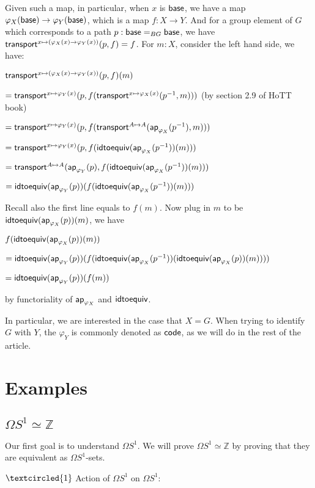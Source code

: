 \documentclass[11pt]{article}
\DeclareMathOperator{\base}{\sf base}
\DeclareMathOperator{\ap}{\sf ap}
\DeclareMathOperator{\code}{\sf code}
\DeclareMathOperator{\transport}{\sf transport}
\DeclareMathOperator{\idtoequiv}{\sf idtoequiv}
\theoremstyle{definition}
\begin{document}
   Given such a map, in particular, when $x$ is $\base$, we have a map $\varphi_X(\base)\to \varphi_Y(\base)$, which is a map $f:X\to Y$.
   And for a group element of $G$ which corresponds to a path $p:\base=_{BG}\base$, we have $\transport^{x\mapsto (\varphi_X(x)\to \varphi_Y(x))}(p, f)=f$. For $m:X$, consider the left hand side, we have:

   $\transport^{x\mapsto (\varphi_X(x)\to \varphi_Y(x))}(p, f)(m)$
   
   $=\transport^{x\mapsto \varphi_Y(x)}(p,f(\transport^{x\mapsto \varphi_X(x)}(p^{-1},m)))$ (by section 2.9 of HoTT book)

   $=\transport^{x\mapsto \varphi_Y(x)}(p,f(\transport^{A\mapsto A}(\ap_{\varphi_X}(p^{-1}),m)))$
   
   $=\transport^{x\mapsto \varphi_Y(x)}(p,f(\idtoequiv(\ap_{\varphi_X}(p^{-1}))(m)))$

   $=\transport^{A\mapsto A}(\ap_{\varphi_Y}(p),f(\idtoequiv(\ap_{\varphi_X}(p^{-1}))(m)))$

   $=\idtoequiv(\ap_{\varphi_Y}(p))(f(\idtoequiv(\ap_{\varphi_X}(p^{-1}))(m)))$
   
   Recall also the first line equals to $f(m)$. Now plug in $m$ to be $\idtoequiv(\ap_{\varphi_X}(p))(m)$, we have 

   $f(\idtoequiv(\ap_{\varphi_X}(p))(m))$

   $=\idtoequiv(\ap_{\varphi_Y}(p))(f(\idtoequiv(\ap_{\varphi_X}(p^{-1}))(\idtoequiv(\ap_{\varphi_X}(p))(m))))$

   $=\idtoequiv(\ap_{\varphi_Y}(p))(f(m))$

   by functoriality of $\ap_{\varphi_X}$ and $\idtoequiv$.

  In particular, we are interested in the case that $X=G$. When trying to identify $G$ with $Y$, the $\varphi_Y$ is commonly denoted as $\code$, as we will do in the rest of the article.
\section{Examples}

\subsection{$\Omega S^1\simeq \mathbb Z$}
Our first goal is to understand $\Omega S^1$. We will prove $\Omega S^1\simeq \mathbb Z$ by proving that they are equivalent as $\Omega S^1$-sets.

$\textcircled{1}$ Action of $\Omega S^1$ on $\Omega S^1$:
\end{document}
